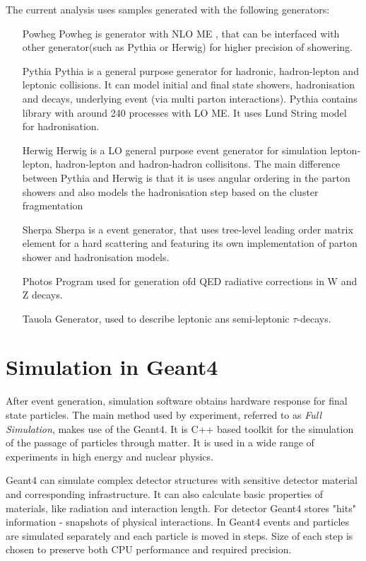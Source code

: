 The current analysis uses samples generated with the following generators:
\begin{itemize}[align=left]
\item[Powheg \cite{Powheg}] Powheg is generator with NLO ME \cite{PowhegNLO}, that can be interfaced with other generator(such as Pythia or Herwig) for higher precision of showering.
\item[Pythia \cite{Pythia6}] Pythia is a general purpose generator for hadronic, hadron-lepton and leptonic collisions. It can model initial and final state showers, hadronisation and decays, underlying event (via multi parton interactions). Pythia contains library with around 240 processes with LO ME. It uses Lund String model \cite{LundString} for hadronisation.
\item[Herwig \cite{Herwig}] Herwig is a LO general purpose event generator for simulation lepton-lepton, hadron-lepton and hadron-hadron collisitons. The main difference between Pythia and Herwig is that it is uses angular ordering in the parton showers and also models the hadronisation step based on the cluster fragmentation
\item[Sherpa \cite{Sherpa}] Sherpa is a event generator, that uses tree-level leading order matrix element for a hard scattering and featuring its own implementation of parton shower and hadronisation models.
\item[Photos \cite{Photos}] Program used for generation ofd QED radiative corrections in W and Z decays.
\item[Tauola \cite{taluola}] Generator, used to describe leptonic ans semi-leptonic $\tau$-decays.
\end{itemize}

\section{Simulation in Geant4}

After event generation, simulation software obtains hardware response for final state particles. The main method used by \atlas experiment, referred to as \textit{Full Simulation}, makes use of the Geant4\cite{Geant4}. It is C++ based toolkit for the simulation of the passage of particles through matter. It is used in a wide range of experiments in high energy and nuclear physics.

Geant4 can simulate complex detector structures with sensitive detector material and corresponding infrastructure. It can also calculate basic properties of materials, like radiation and interaction length. For detector Geant4 stores "hits" information  - snapshots of physical interactions. 
In Geant4 events and particles are simulated separately and each particle is moved in steps. Size of each step is chosen to preserve both CPU performance and required precision. 

